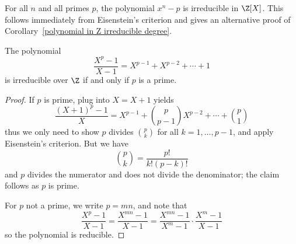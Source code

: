 \begin{example}
For all $n$ and all primes $p$, the polynomial $x^n-p$ is irreducible in $\Z[X]$. This follows immediately from Eisenstein's criterion and gives an alternative proof of Corollary~\ref{polynomial in Z irreducible degree}.
\end{example}
\begin{proposition}
The polynomial
\[\dfrac{X^p-1}{X-1}=X^{p-1}+X^{p-2}+\cdots+1\]
is irreducible over $\Z$ if and only if $p$ is a prime.
\end{proposition}
\begin{proof}
If $p$ is prime, plug into $X=X+1$ yields
\[\dfrac{(X+1)^p-1}{X}=X^{p-1}+\binom{p}{p-1}X^{p-2}+\cdots+\binom{p}{1}\]
thus we only need to show $p$ divides $\binom{p}{k}$ for all $k=1,\dots,p-1$, and apply Eisenstein's criterion. But we have
\[\binom{p}{k}=\dfrac{p!}{k!(p-k)!}\]
and $p$ divides the numerator and does not divide the denominator; the claim follows as $p$ is prime.\par
For $p$ not a prime, we write $p=mn$, and note that
\[\dfrac{X^p-1}{X-1}=\dfrac{X^{mn}-1}{X-1}=\dfrac{X^{mn}-1}{X^m-1}\cdot\dfrac{X^m-1}{X-1}\]
so the polynomial is reducible.
\end{proof}
